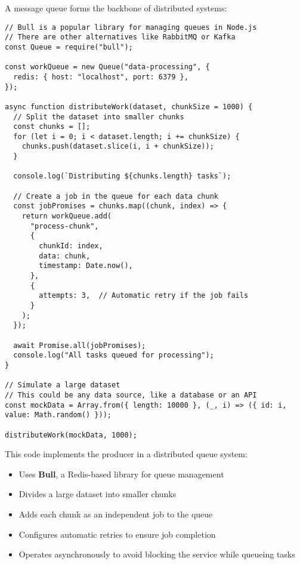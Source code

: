 \documentclass[12pt,letterpaper]{article}
\newenvironment{macterminal}{%
    \begin{mdframed}[
        linecolor=terminalFrame,
        backgroundcolor=terminalBg,
        roundcorner=5pt,
        skipabove=5pt,
        skipbelow=5pt,
        linewidth=1pt,
        innertopmargin=5pt,
        frametitle={%
            \tikz[baseline=(current bounding box.east), outer sep=0pt]{
                \fill[red!80!black] (0,0) circle (5pt);
                \fill[yellow!80!black] (0.7,0) circle (5pt);
                \fill[green!70!black] (1.4,0) circle (5pt);
            }
        },
        frametitlealignment=\raggedright,
        frametitleaboveskip=8pt,
        frametitlebelowskip=0pt,
    ]
}{%
    \end{mdframed}%
}
\begin{document}
A message queue forms the backbone of distributed systems:

\begin{macterminal}
\begin{lstlisting}
// Bull is a popular library for managing queues in Node.js
// There are other alternatives like RabbitMQ or Kafka
const Queue = require("bull");

const workQueue = new Queue("data-processing", {
  redis: { host: "localhost", port: 6379 },
});

async function distributeWork(dataset, chunkSize = 1000) {
  // Split the dataset into smaller chunks
  const chunks = [];
  for (let i = 0; i < dataset.length; i += chunkSize) {
    chunks.push(dataset.slice(i, i + chunkSize));
  }

  console.log(`Distributing ${chunks.length} tasks`);

  // Create a job in the queue for each data chunk
  const jobPromises = chunks.map((chunk, index) => {
    return workQueue.add(
      "process-chunk",
      {
        chunkId: index,
        data: chunk,
        timestamp: Date.now(),
      },
      {
        attempts: 3,  // Automatic retry if the job fails
      }
    );
  });

  await Promise.all(jobPromises);
  console.log("All tasks queued for processing");
}

// Simulate a large dataset
// This could be any data source, like a database or an API
const mockData = Array.from({ length: 10000 }, (_, i) => ({ id: i, value: Math.random() }));

distributeWork(mockData, 1000);
\end{lstlisting}
\end{macterminal}

This code implements the producer in a distributed queue system:
\begin{itemize}
    \item Uses \textbf{\textcolor{accentColor}{Bull}}, a Redis-based library for queue management
    \item Divides a large dataset into smaller chunks
    \item Adds each chunk as an independent job to the queue
    \item Configures automatic retries to ensure job completion
    \item Operates asynchronously to avoid blocking the service while queueing tasks
\end{itemize}
\end{document}

